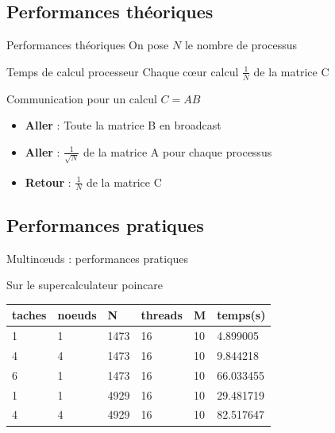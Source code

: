 \documentclass[9.5pt]{beamer}
\begin{document}
	\subsection{Performances théoriques}
		\begin{frame}{Performances théoriques}
			On pose $N$ le nombre de processus
			\begin{block}{Temps de calcul processeur}
				Chaque c\oe{}ur calcul $\frac{1}{N}$ de la matrice C
			\end{block}
			\begin{block}{Communication pour un calcul $C = AB$}
				\begin{itemize}
					\item \textbf{Aller} : Toute la matrice B en broadcast
					\item \textbf{Aller} : $\frac{1}{\sqrt{N}}$ de la matrice A pour chaque processus
					\item \textbf{Retour} : $\frac{1}{N}$ de la matrice C
				\end{itemize}
				
			\end{block}
		\end{frame}

	\subsection{Performances pratiques}

		\begin{frame}{Multin\oe{}uds : performances pratiques}
			\begin{block}{Sur le supercalculateur poincare}
				\begin{tabular}{l l l l l l}
					taches	& noeuds & N & threads & M & temps(s)\\ \hline
					1 		& 1 & 1473 & 16 & 10 & 4.899005\\
					4 		& 4 & 1473 & 16 & 10 & 9.844218\\
					6 		& 1 & 1473 & 16 & 10 & 66.033455\\ \hline
					1 & 1 & 4929 & 16 & 10 & 29.481719\\
					4 & 4 & 4929 & 16 & 10 & 82.517647\\
				\end{tabular}
			\end{block}
		\end{frame}
\end{document}
